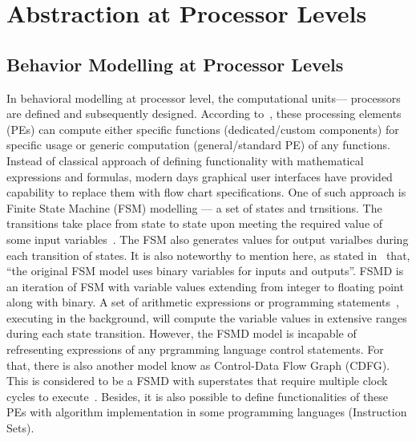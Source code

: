 \section{Abstraction at Processor Levels}
\subsection{Behavior Modelling at Processor Levels}
In behavioral modelling at processor level, the computational units--- processors are defined and subsequently designed. According to~\cite{Gajski.2009}, these processing elements (PEs) can compute either specific functions (dedicated/custom components) for specific usage or generic computation (general/standard PE) of any functions.\\
Instead of classical approach of defining functionality with mathematical expressions and formulas, modern days graphical user interfaces have provided capability to replace them with flow chart specifications. One of such approach is Finite State Machine (FSM) modelling --- a set of states and trnsitions. The transitions take place from state to state upon meeting the required value of some input variables~\cite{Gajski.2009}. The FSM also generates values for output varialbes during each transition of states. It is also noteworthy to mention here, as stated in~\cite{Gajski.2009} that, ``the original FSM model uses binary variables for inputs and outputs''. FSMD is an iteration of FSM with variable values extending from integer to floating point along with binary. A set of arithmetic expressions or programming statements~\cite{Gajski.2009}, executing in the background, will compute the variable values in extensive ranges during each state transition. However, the FSMD model is incapable of refresenting expressions of any prgramming language control statements. For that, there is also another model know as Control-Data Flow Graph (CDFG). This is considered to be a FSMD with superstates that require multiple clock cycles to execute~\cite{Gajski.2009}. Besides, it is also possible to define functionalities of these PEs with algorithm implementation in some programming languages (Instruction Sets).
